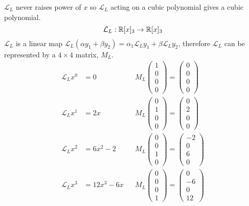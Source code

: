 \documentclass[10pt, a4paper]{article}
\begin{document}
$\mathcal{L}_L$ never raises power of $x$ so $\mathcal{L}_L$ acting on a cubic polynomial gives a cubic polynomial.
\[
\mathcal{L}_L : \mathbb{R}[x]_3 \rightarrow \mathbb{R}[x]_3
\]
$\mathcal{L}_L$ is a linear map $\mathcal{L}_L(\alpha y_1 + \beta y_2) = \alpha_1\mathcal{L}_Ly_1 + \beta\mathcal{L}_Ly_2$,
therefore $\mathcal{L}_L$ can be represented by a $4 \times 4$ matrix,
$M_L$.
\begin{align*}
    \mathcal{L}_Lx ^ 0 &= 0 && M_L \begin{pmatrix}
        1 \\ 0 \\ 0 \\ 0
    \end{pmatrix} = \begin{pmatrix}
        0 \\ 0 \\ 0 \\ 0
    \end{pmatrix} \\
    \mathcal{L}_L x ^ 1 &= 2x && M_L\begin{pmatrix}
        0 \\ 1 \\ 0 \\ 0
    \end{pmatrix} = \begin{pmatrix}
        0 \\ 2 \\ 0 \\ 0
    \end{pmatrix} \\
    \mathcal{L}_L x ^ 2 &= 6x ^ 2 - 2 &&  M_L\begin{pmatrix}
        0 \\ 0 \\ 1 \\ 0
    \end{pmatrix} = \begin{pmatrix}
        -2 \\ 0 \\ 6 \\ 0
    \end{pmatrix} \\
    \mathcal{L}_L x ^ 3 &= 12x ^ 3 - 6x && M_L \begin{pmatrix}
        0 \\ 0 \\ 0 \\ 1
    \end{pmatrix} = \begin{pmatrix}
        0 \\ -6 \\ 0 \\ 12
    \end{pmatrix}
\end{align*}
\end{document}
